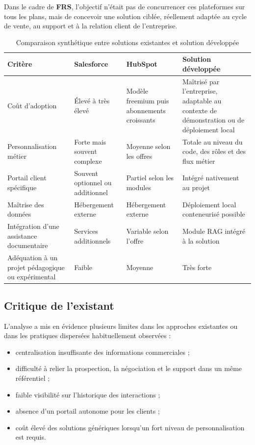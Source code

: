 Dans le cadre de \textbf{FRS}, l'objectif n'était pas de concurrencer ces plateformes sur tous les plans, mais de concevoir une solution ciblée, réellement adaptée au cycle de vente, au support et à la relation client de l'entreprise.

\begin{table}[H]
\centering
\caption{Comparaison synthétique entre solutions existantes et solution développée}
\label{tab:comparaison_crm}
\begin{tabularx}{\textwidth}{|l|X|X|X|}
\hline
\textbf{Critère} & \textbf{Salesforce} & \textbf{HubSpot} & \textbf{Solution développée} \\
\hline
Coût d'adoption & Élevé à très élevé & Modèle freemium puis abonnements croissants & Maîtrisé par l'entreprise, adaptable au contexte de démonstration ou de déploiement local \\
\hline
Personnalisation métier & Forte mais souvent complexe & Moyenne selon les offres & Totale au niveau du code, des rôles et des flux métier \\
\hline
Portail client spécifique & Souvent optionnel ou additionnel & Partiel selon les modules & Intégré nativement au projet \\
\hline
Maîtrise des données & Hébergement externe & Hébergement externe & Déploiement local conteneurisé possible \\
\hline
Intégration d'une assistance documentaire & Services additionnels & Variable selon l'offre & Module RAG intégré à la solution \\
\hline
Adéquation à un projet pédagogique ou expérimental & Faible & Moyenne & Très forte \\
\hline
\end{tabularx}
\end{table}

\subsection{Critique de l'existant}
L'analyse a mis en évidence plusieurs limites dans les approches existantes ou dans les pratiques dispersées habituellement observées :
\begin{itemize}
    \item centralisation insuffisante des informations commerciales ;
    \item difficulté à relier la prospection, la négociation et le support dans un même référentiel ;
    \item faible visibilité sur l'historique des interactions ;
    \item absence d'un portail autonome pour les clients ;
    \item coût élevé des solutions génériques lorsqu'un fort niveau de personnalisation est requis.
\end{itemize}

